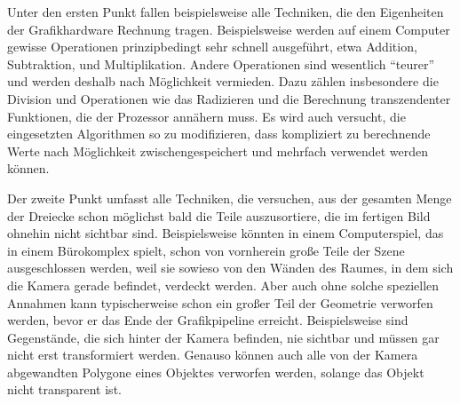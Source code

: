 Unter den ersten Punkt fallen beispielsweise alle Techniken, die den Eigenheiten der Grafikhardware Rechnung tragen. Beispielsweise werden auf einem Computer gewisse Operationen prinzipbedingt sehr schnell ausgeführt, etwa Addition, Subtraktion, und Multiplikation. Andere Operationen sind wesentlich \enquote{teurer} und werden deshalb nach Möglichkeit vermieden. Dazu zählen insbesondere die Division und Operationen wie das Radizieren und die Berechnung transzendenter Funktionen, die der Prozessor annähern muss. Es wird auch versucht, die eingesetzten Algorithmen so zu modifizieren, dass kompliziert zu berechnende Werte nach Möglichkeit zwischengespeichert und mehrfach verwendet werden können.

Der zweite Punkt umfasst alle Techniken, die versuchen, aus der gesamten Menge der Dreiecke schon möglichst bald die Teile auszusortiere, die im fertigen Bild ohnehin nicht sichtbar sind. Beispielsweise könnten in einem Computerspiel, das in einem Bürokomplex spielt, schon von vornherein große Teile der Szene ausgeschlossen werden, weil sie sowieso von den Wänden des Raumes, in dem sich die Kamera gerade befindet, verdeckt werden. Aber auch ohne solche speziellen Annahmen kann typischerweise schon ein großer Teil der Geometrie verworfen werden, bevor er das Ende der Grafikpipeline erreicht. Beispielsweise sind Gegenstände, die sich hinter der Kamera befinden, nie sichtbar und müssen gar nicht erst transformiert werden. Genauso können auch alle von der Kamera abgewandten Polygone eines Objektes verworfen werden, solange das Objekt nicht transparent ist.